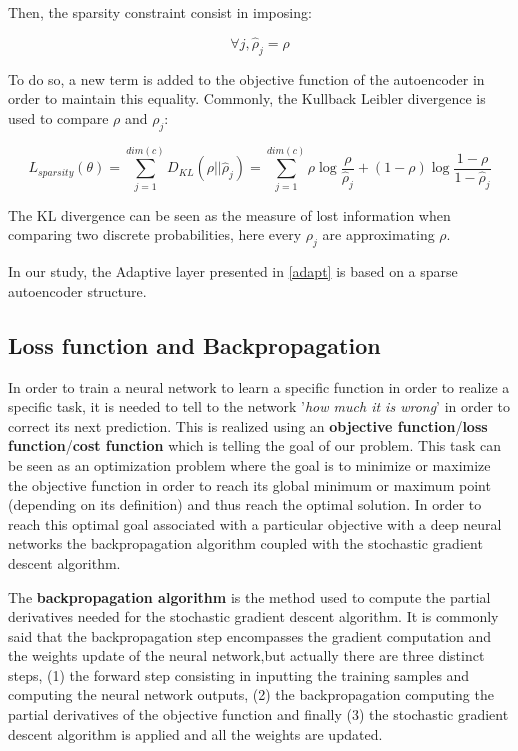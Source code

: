 \documentclass[master, tikz, final,11pt, dvipdfmx]{iscs-thesis}
\begin{document}
Then, the sparsity constraint consist in imposing:

\[
\forall j,  \hat{\rho}_j = \rho
\]

To do so, a new term is added to the objective function of the autoencoder in order to maintain this equality. Commonly, the Kullback Leibler divergence is used to compare $\rho$ and $\rho_j$:

\[
L_{sparsity}(\theta) = \sum_{j=1}^{dim(c)}{D_{KL}(\rho||\hat{\rho}_j)} = \sum_{j=1}^{dim(c)}{\rho\log \frac{\rho}{\hat{\rho}_j}} + (1-\rho)\log \frac{1-\rho}{1-\hat{\rho}_j}
\]

The KL divergence can be seen as the measure of lost information when comparing two discrete probabilities, here every $\rho_j$ are approximating $\rho$.

In our study, the Adaptive layer presented in \autoref{adapt} is based on a sparse autoencoder structure.


\subsection{Loss function and Backpropagation}
\label{loss}
In order to train a neural network to learn a specific function in order to realize a specific task, it is needed to tell to the network '\textit{how much it is wrong}' in order to correct its next prediction. This is realized using an \textbf{objective function}/\textbf{loss function}/\textbf{cost function} which is telling the goal of our problem. This task can be seen as an optimization problem where the goal is to minimize or maximize the objective function in order to reach its global minimum or maximum point (depending on its definition) and thus reach the optimal solution. In order to reach this optimal goal associated with a particular objective with a deep neural networks the backpropagation algorithm coupled with the stochastic gradient descent algorithm.


The \textbf{backpropagation algorithm} \cite{BACKPROP} is the method used to compute the partial derivatives needed for the stochastic gradient descent algorithm. It is commonly said that the backpropagation step encompasses the gradient computation and the weights update of the neural network,but actually there are three distinct steps, (1) the forward step consisting in inputting the training samples and computing the neural network outputs, (2) the backpropagation computing the partial derivatives of the objective function and finally (3) the stochastic gradient descent algorithm is applied and all the weights are updated.
\end{document}
